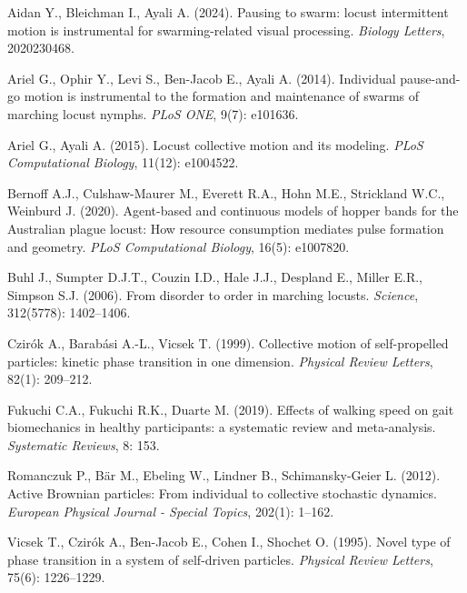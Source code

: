 \documentclass[11pt,a4paper]{article}
\begin{document}
\begin{thebibliography}{9}

Aidan Y., Bleichman I., Ayali A. (2024). Pausing to swarm: locust intermittent motion is instrumental for swarming-related visual processing. \emph{Biology Letters}, 2020230468.

Ariel G., Ophir Y., Levi S., Ben-Jacob E., Ayali A. (2014). Individual pause-and-go motion is instrumental to the formation and maintenance of swarms of marching locust nymphs. \emph{PLoS ONE}, 9(7): e101636.

Ariel G., Ayali A. (2015). Locust collective motion and its modeling. \emph{PLoS Computational Biology}, 11(12): e1004522.

Bernoff A.J., Culshaw-Maurer M., Everett R.A., Hohn M.E., Strickland W.C., Weinburd J. (2020). Agent-based and continuous models of hopper bands for the Australian plague locust: How resource consumption mediates pulse formation and geometry. \emph{PLoS Computational Biology}, 16(5): e1007820.

Buhl J., Sumpter D.J.T., Couzin I.D., Hale J.J., Despland E., Miller E.R., Simpson S.J. (2006). From disorder to order in marching locusts. \emph{Science}, 312(5778): 1402–1406.

Czirók A., Barabási A.-L., Vicsek T. (1999). Collective motion of self-propelled particles: kinetic phase transition in one dimension. \emph{Physical Review Letters}, 82(1): 209–212.

Fukuchi C.A., Fukuchi R.K., Duarte M. (2019). Effects of walking speed on gait biomechanics in healthy participants: a systematic review and meta-analysis. \emph{Systematic Reviews}, 8: 153.

Romanczuk P., Bär M., Ebeling W., Lindner B., Schimansky-Geier L. (2012). Active Brownian particles: From individual to collective stochastic dynamics. \emph{European Physical Journal - Special Topics}, 202(1): 1–162.

Vicsek T., Czirók A., Ben-Jacob E., Cohen I., Shochet O. (1995). Novel type of phase transition in a system of self-driven particles. \emph{Physical Review Letters}, 75(6): 1226–1229.

\end{thebibliography}
\end{document}
